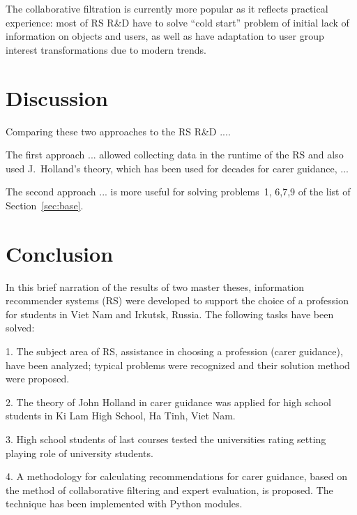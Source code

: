 \documentclass[conference,a4]{IEEEtran}
\begin{document}
The collaborative filtration is currently more popular as it reflects practical experience: most of RS R\&D have to solve ``cold start'' problem of initial lack of information on objects and users, as well as have adaptation to user group interest transformations due to modern trends.



\section{Discussion}
\label{sec:disc}

Comparing these two approaches to the RS R\&D ....

The first approach ... allowed collecting data in the runtime of the RS and also used J.~Holland's theory, which has been used for decades for carer guidance, ...

The second approach ... is more useful for solving problems~1, 6,7,9 of the list of Section~\ref{sec:base}.



\section{Conclusion}
\label{sec:conc}


In this brief narration of the results of two master theses, information recommender systems (RS) were developed to support the choice of a profession for students in Viet Nam and Irkutsk, Russia. The following tasks have been solved:

1. The subject area of ​​RS, assistance in choosing a profession (carer guidance), have been analyzed; typical problems were recognized and their solution method were proposed.

2. The theory of John Holland in carer guidance was applied for high school students in Ki Lam High School, Ha Tinh, Viet Nam.

3. High school students of last courses tested the universities rating setting playing role of university students.

4. A methodology for calculating recommendations for carer guidance, based on the method of collaborative filtering and expert evaluation, is proposed.  The technique has been implemented with Python modules.
\end{document}
